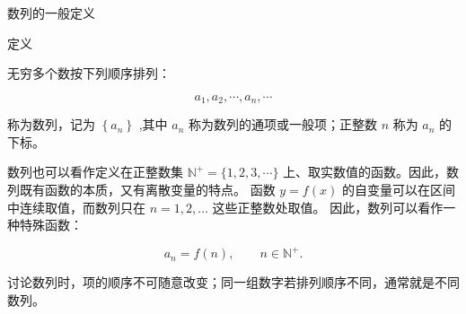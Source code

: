 \documentclass[aspectratio=169,10pt,fontset=fandol]{ctexbeamer}
\begin{document}
\begin{frame}[t,fragile]{数列的一般定义}
\normalsize
\begin{block}{定义}
{\normalsize


无穷多个数按下列顺序排列：



$$

a_1, a_2, \cdots, a_n, \cdots

$$



称为数列，记为 $\left\{a_n\right\}$ ,其中 $a_n$ 称为数列的通项或一般项；正整数 $n$ 称为 $a_n$ 的下标。



数列也可以看作定义在正整数集 $\mathbb{N}^+=\{1,2,3,\cdots\}$ 上、取实数值的函数。因此，数列既有函数的本质，又有离散变量的特点。 函数 $y=f(x)$ 的自变量可以在区间中连续取值，而数列只在 $n=1,2,\ldots$ 这些正整数处取值。 因此，数列可以看作一种特殊函数：

\[

a_n=f(n),\qquad n\in\mathbb{N}^+.

\]

讨论数列时，项的顺序不可随意改变；同一组数字若排列顺序不同，通常就是不同数列。


}
\end{block}
\end{frame}
\end{document}
